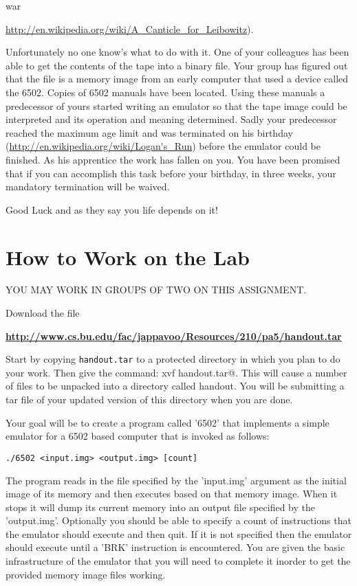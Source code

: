 \documentclass[11pt]{article}
\begin{document}
war {\url{http://en.wikipedia.org/wiki/A_Canticle_for_Leibowitz}).

Unfortunately no one know's what to do with it.  One of your
colleagues has been able to get the contents of the tape into a
binary file.  Your group has figured out that the file is a memory
image from an early computer that used a device called the 6502.
Copies of 6502 manuals have been located.  Using these manuals a
predecessor of yours started writing an emulator so that the
tape image could be interpreted and its operation and meaning
determined.  Sadly your predecessor reached the maximum age
limit and was terminated on his birthday
(\url{http://en.wikipedia.org/wiki/Logan's_Run}) before the emulator
could be finished.  As his apprentice the work has fallen on you.
You have been promised that if you can accomplish this task before
your birthday, in three weeks, your mandatory termination will be
waived.

Good Luck and as they say you life depends on it! 


\section{How to Work on the Lab}

YOU MAY WORK IN GROUPS OF TWO ON THIS ASSIGNMENT.

Download the file \\
\begin{center}
{\small
\bf
\url{http://www.cs.bu.edu/fac/jappavoo/Resources/210/pa5/handout.tar}
}
\end{center}

Start by copying \texttt{handout.tar} to a protected directory
in which you plan to do your work.  Then give the command:
\verb@tar xvf handout.tar@.  This will cause a number of files
to be unpacked into a directory called handout.  You will be
submitting a tar file of your updated version of this directory when you are done.

Your goal will be to create a program called '6502' that implements a
simple emulator for a 6502 based computer that is invoked as follows:
\begin{center}
\begin{verbatim}
./6502 <input.img> <output.img> [count]
\end{verbatim}
\end{center}
The program reads in the file specified by the 'input.img' argument as
the initial image of its memory and then executes based on that
memory image.  When it stops it will dump its current memory into an
output file specified by the 'output.img'.  Optionally you should be
able to specify a count of instructions that the emulator should
execute and then quit.  If it is not specified then the emulator should
execute until a 'BRK' instruction is encountered.    You are given the
basic infrastructure of the emulator that you will need to complete it
inorder to get the provided memory image files working.  

}
\end{document}
